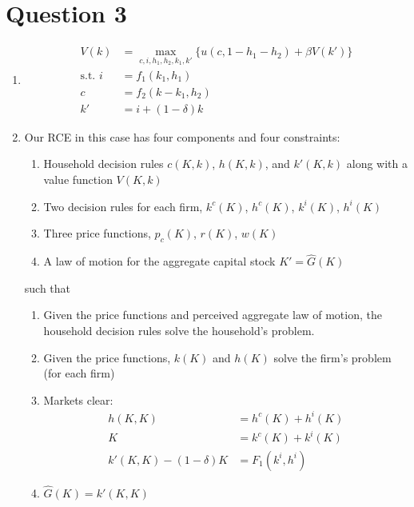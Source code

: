 \documentclass[11pt]{article}
\begin{document}
\section{Question 3}
\label{sec:org0b176f4}
\begin{enumerate}[label=(\alph*)]
\item 
\begin{align*}
V(k) &= \max_{c, i, h_1, h_2, k_1, k'} \{u(c, 1 - h_1 - h_2) + \beta V(k')\}\\
\text{s.t. } i &= f_1(k_1, h_1)\\
c &= f_2(k - k_1, h_2)\\
k' &= i + (1 - \delta)k
\end{align*}
\item Our RCE in this case has four components and four constraints:
\begin{enumerate}[label=\arabic*.]
\item Household decision rules $c(K, k)$, $h(K, k)$, and $k'(K, k)$ along with a value function $V(K, k)$
\item Two decision rules for each firm, $k^c(K)$, $h^c(K)$, $k^i(K)$, $h^i(K)$
\item Three price functions, $p_c(K)$, $r(K)$, $w(K)$
\item A law of motion for the aggregate capital stock $K' = \hat{G}(K)$
\end{enumerate}
such that
\begin{enumerate}[label=(\alph*)]
\item Given the price functions and perceived aggregate law of motion, the household decision rules solve the household's problem.
\item Given the price functions, $k(K)$ and $h(K)$ solve the firm's problem (for each firm)
\item Markets clear:
\begin{align*}
h(K, K) &= h^c(K) + h^i(K)\\
K &= k^c(K) + k^i(K)\\
k'(K, K) - (1 - \delta)K &= F_1(k^i, h^i)
\end{align*}
\item $\hat{G}(K) = k'(K, K)$
\end{enumerate}
\end{enumerate}
\end{document}

